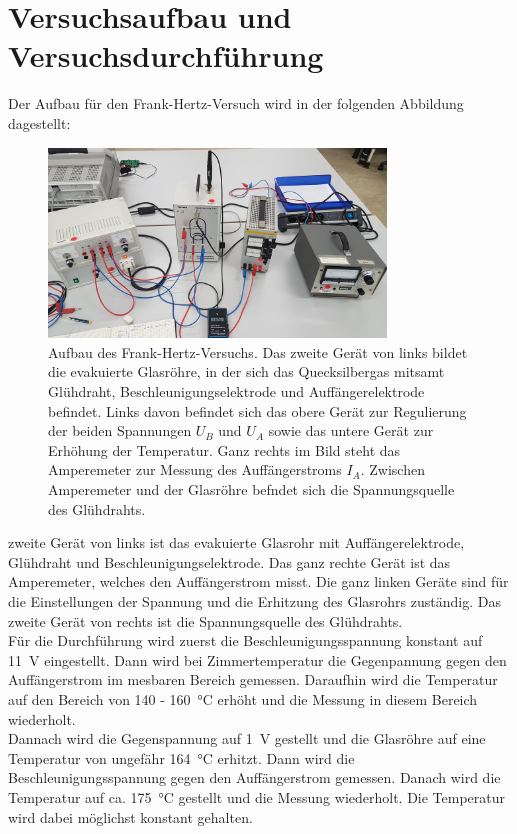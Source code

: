 \section{Versuchsaufbau und Versuchsdurchführung}\justifying
Der Aufbau für den Frank-Hertz-Versuch wird in der folgenden Abbildung dagestellt:
\begin{figure}[H]
    \centering
    \includegraphics[width=0.8\textwidth]{images/Aufbau.jpg}
    \caption{
        Aufbau des Frank-Hertz-Versuchs.
        Das zweite Gerät von links bildet die evakuierte Glasröhre, in der sich
        das Quecksilbergas mitsamt Glühdraht, Beschleunigungselektrode und Auffängerelektrode
        befindet. Links davon befindet sich das obere Gerät zur Regulierung der beiden Spannungen
        $U_B$ und $U_A$ sowie das untere Gerät zur Erhöhung der Temperatur. Ganz rechts im Bild steht
        das Amperemeter zur Messung des Auffängerstroms $I_A$. Zwischen Amperemeter und
        der Glasröhre befndet sich die Spannungsquelle des Glühdrahts.
    } 
    \label{fig:4}
\end{figure}
 zweite Gerät von links ist das evakuierte Glasrohr mit Auffängerelektrode, Glühdraht und
Beschleunigungselektrode. Das ganz rechte Gerät ist das Amperemeter, welches den
Auffängerstrom misst. Die ganz linken Geräte sind für die Einstellungen der Spannung und 
die Erhitzung des Glasrohrs zuständig. Das zweite Gerät von rechts ist die Spannungsquelle
des Glühdrahts.\\
Für die Durchführung wird zuerst die Beschleunigungsspannung konstant auf \SI{11}{\volt} eingestellt.
Dann wird bei Zimmertemperatur die Gegenpannung gegen den Auffängerstrom im mesbaren Bereich gemessen.
Daraufhin wird die Temperatur auf den Bereich von 140 - \SI{160}{\celsius} erhöht und die Messung in diesem Bereich wiederholt.\\
Dannach wird die Gegenspannung auf \SI{1}{\volt} gestellt und die Glasröhre auf eine Temperatur von
ungefähr \SI{164}{\celsius} erhitzt. Dann wird die Beschleunigungsspannung gegen
den Auffängerstrom gemessen. Danach wird die Temperatur auf ca. \SI{175}{\celsius} gestellt 
und die Messung wiederholt. Die Temperatur wird dabei möglichst konstant gehalten.


